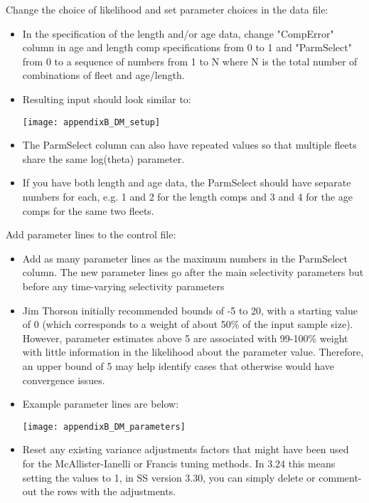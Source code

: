 
Change the choice of likelihood and set parameter choices in the data file:

\begin{itemize}
	\item In the specification of the length and/or age data, change "CompError" column in age and length comp specifications from 0 to 1 and "ParmSelect" from 0 to a sequence of numbers from 1 to N where N is the total number of combinations of fleet and age/length.
	
	\item Resulting input should look similar to:
	\begin{center}
		\texttt{[image: appendixB\_DM\_setup]}\\
	\end{center}
	
	\item The ParmSelect column can also have repeated values so that multiple fleets share the same log(theta) parameter.
	
	\item If you have both length and age data, the ParmSelect should have separate numbers for each, e.g. 1 and 2 for the length comps and 3 and 4 for the age comps for the same two fleets.
	
\end{itemize}

Add parameter lines to the control file:

\begin{itemize}
	\item Add as many parameter lines as the maximum numbers in the ParmSelect column. The new parameter lines go after the main selectivity parameters but before any time-varying selectivity parameters
	
	\item Jim Thorson initially recommended bounds of -5 to 20, with a starting value of 0
	(which corresponds to a weight of about 50\% of the input sample size). However, parameter estimates above 5 are associated with 99-100\% weight with little information in the likelihood about the parameter value. Therefore, an upper bound of 5 may help identify cases that otherwise would have convergence issues.
	
	\item Example parameter lines are below: 
		\begin{center}
			\texttt{[image: appendixB\_DM\_parameters]}\\
		\end{center}
	
	\item Reset any existing variance adjustments factors that might have been used for the McAllister-Ianelli or Francis tuning methods. In 3.24 this means setting the values to 1, in SS version 3.30, you can simply delete or comment-out the rows with the adjustments.
\end{itemize}


